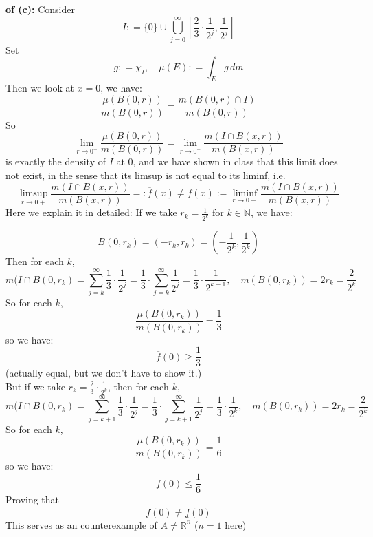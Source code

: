 \documentclass[lang=cn,11pt]{elegantbook}
\begin{document}
\begin{example}
    \textbf{of (c):}
    Consider \[
    I : = \{0\} \cup \bigcup_{j=0}^\infty [\frac{2}{3} \cdot \frac{1}{2^j}, \frac{1}{2^j}]
    \]
    Set $$g: = \chi_I,\quad    \mu(E) : = \int_E g \, dm $$
    Then we look at $x = 0$, we have:  $$
\frac{\mu(B(0, r))}{m(B(0, r))}=\frac{m(B(0, r) \cap I)}{m(B(0, r))}
$$
    So \[
  \lim_{r\to 0^+} \frac{\mu(B(0, r))}{m(B(0, r))} =     \lim_{r\to 0^+} \frac{m(I \cap B(x,r))}{m(B(x,r))}  
    \] is exactly the density of $I$ at $0$, and we have shown in class that this limit does not exist, in the sense that its limsup is not equal to its liminf, i.e.  \[
    \limsup_{r\to0+}\frac{m(I \cap B(x,r))}{m(B(x,r))} =:  \overline f(x) \not =  
      \underline f(x):=\liminf_{r\to0+}\frac{m(I \cap B(x,r))}{m(B(x,r))}
    \]
Here we explain it in detailed: 
If we take $r_k=\frac{1}{2^k}$ for $k\in \mathbb{N}$, we have:

$$
B\left(0, r_k\right)=\left(-r_k, r_k\right)=\left(-\frac{1}{2^k}, \frac{1}{2^k}\right)
$$
Then for each $k$,  \[
m(I \cap B(0, r_k)=\sum_{j=k}^{\infty} \frac{1}{3} \cdot \frac{1}{2^j}=\frac{1}{3} \cdot \sum_{j=k}^{\infty} \frac{1}{2^j}=\frac{1}{3} \cdot \frac{1}{2^{k-1}},\quad m(B\left(0, r_k\right))=2 r_k=\frac{2}{2^k}
\]
So  for each $k$,  \[
\frac{\mu(B(0, r_k))}{m(B(0, r_k))}=\frac{1}{3}
\]
so we have: \[
  \overline f(0) \geq \frac{1}{3}
\]
(actually equal, but we don't have to show it.)\\
But if we take $r_k = \frac{2}{3} \cdot \frac{1}{2^k}$, then for each $k$,  \[
m(I \cap B(0, r_k)=\sum_{j=k+1}^{\infty} \frac{1}{3} \cdot \frac{1}{2^j}=\frac{1}{3} \cdot \sum_{j=k+1}^{\infty} \frac{1}{2^j}=\frac{1}{3} \cdot \frac{1}{2^{k}},\quad m(B\left(0, r_k\right))=2 r_k=\frac{2}{2^k}
\]
So  for each $k$,  \[
\frac{\mu(B(0, r_k))}{m(B(0, r_k))}=\frac{1}{6}
\]
so we have: \[
  \underline f(0) \leq \frac{1}{6}
\]
Proving that \[
 \overline f(0) \not =   \underline f(0) 
\]
This serves as an counterexample of $A \not = \mathbb{R}^n$ ($n=1$ here)
\end{example}



  
\end{document}
